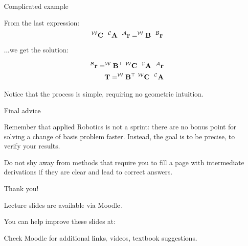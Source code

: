 \documentclass{beamer}
\begin{document}
\begin{frame}{Complicated example}
	\begin{flushleft}
		
		From the last expression:
		\begin{equation}
			^\mathcal{W} \mathbf{C} \ \ ^\mathcal{C}\mathbf{A} \ \ ^\mathcal{A} \mathbf{r} = 
			^\mathcal{W} \mathbf{B} \ \ ^\mathcal{B} \mathbf{r}
		\end{equation}
		
		...we get the solution:
		
		\begin{align}			
			^\mathcal{B} \bo{r} = ^\mathcal{W} \bo{B}\T  \ ^\mathcal{W} \bo{C} \ \ ^\mathcal{C}\bo{A} \ \ ^\mathcal{A} \bo{r} \\
			\bo{T} = ^\mathcal{W} \bo{B}\T  \ ^\mathcal{W} \bo{C} \ \ ^\mathcal{C}\bo{A}
		\end{align}
				
				Notice that the process is simple, requiring no geometric intuition.
		
	\end{flushleft}
\end{frame}



\begin{frame}{Final advice}
	\begin{flushleft}
		
		Remember that applied Robotics is not a sprint: there are no bonus point for solving a change of basis problem faster. Instead, the goal is to be precise, to verify your results. 
		
		\bigskip
		
		Do not shy away from methods that require you to fill a page with intermediate derivations if they are clear and lead to correct answers.
		
	\end{flushleft}
\end{frame}



\begin{frame}{Thank you!}
\centerline{Lecture slides are available via Moodle.}
\bigskip
\centerline{You can help improve these slides at:}
\centerline{\mygit}
\bigskip
\centerline{Check Moodle for additional links, videos, textbook suggestions.}
\bigskip

\centerline{\textcolor{black}{}}

\end{frame}
\end{document}
